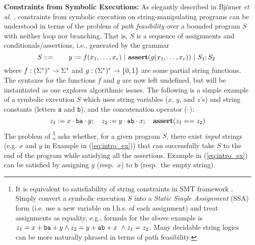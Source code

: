 \smallskip
\noindent
\textbf{Constraints from Symbolic Executions: }
As elegantly described in Bj\"{o}rner \emph{et al.} \cite{BTV09}, constraints 
from symbolic 
execution on string-manipulating programs can be understood in terms of the
problem of \emph{path 
feasibility} over a bounded program $S$ with neither loop nor
branching. %
That is, $S$ is a sequence of assignments and conditionals/assertions, i.e., 
generated by the grammar
\begin{equation} 
    S ::= \qquad y := f(x_1,\ldots,x_\arity) \ |\
    \text{\ASSERT{$g(x_1,\ldots,x_\arity)$}}\ |\ 
            S_1; S_2\ 
            \label{eq:symbex}
\end{equation}
where $f: (\Sigma^*)^r \to \Sigma^*$ and $g: (\Sigma^*)^r \to \{0,1\}$ are
some partial string functions. 
The syntaxes for the functions $f$ and $g$ are now
left undefined, but will be instantiated as one explores algorithmic issues.
The following is a simple example of a symbolic execution $S$
which uses string variables ($x$, $y$, and $z$'s) and string constants
(letters \texttt{a} and \texttt{b}), and the concatenation operator ($\cdot$):
\begin{equation}
        z_1 := x \cdot \text{\texttt{ba}} \cdot y;\quad 
        z_2 := y \cdot \text{\texttt{ab}} \cdot x;\quad
        \textbf{assert}(z_1 == z_2)
        \label{eq:intro_ex}
\end{equation}
The problem of \footnote{
    It is equivalent to 
satisfiability of string constraints in SMT framework
\cite{SMT-CACM,SMT-chapter,KS08}.
Simply convert a symbolic execution $S$ 
into a \emph{Static Single Assignment} (SSA) form (i.e. use a new 
variable 
on l.h.s. of each assignment) and treat assignments as equality,
e.g., formula for the above example is
        $z_1 = x + \text{\texttt{ba}} + y \wedge
        z_2 = y + \text{\texttt{ab}} + x\ \wedge
        z_1 = z_2$.
Many decidable string logics can be more naturally phrased in terms of
path feasibility.}
asks whether, for a given program $S$, there exist \emph{input} strings (e.g.
$x$ and $y$ in Example in (\ref{eq:intro_ex}))
that can successfully take
$S$ to the end of the program while satisfying all the assertions. 
Example in (\ref{eq:intro_ex}) can be satisfied by
assigning $y$ (resp.~$x$) to $\texttt{b}$ (resp.~the empty string). 


